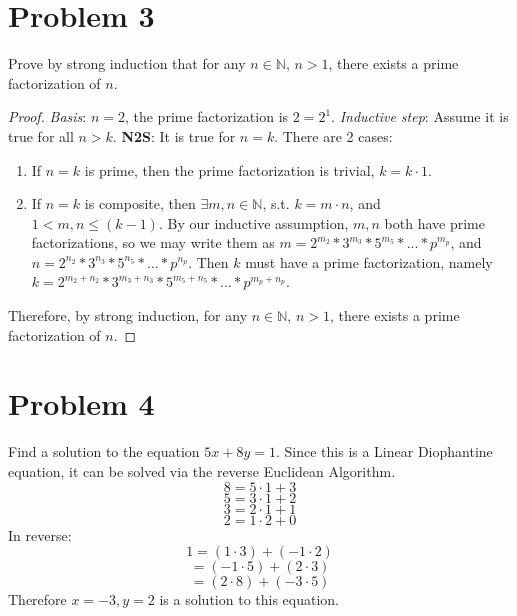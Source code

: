\documentclass[12pt]{article}
\newcommand{\N}{\mathbb{N}}
\begin{document}
\section{Problem 3}
Prove by strong induction that for any $n\in\N$, $n>1$, there exists a prime factorization of $n$.
\begin{proof}
\emph{Basis}: $n=2$, the prime factorization is $2=2^1$.
\newline \emph{Inductive step}: Assume it is true for all $n>k$. \newline \textbf{N2S}: It is true for $n=k$. There are 2 cases:\begin{enumerate}
    \item If $n=k$ is prime, then the prime factorization is trivial, $k=k\cdot1$.
    \item If $n=k$ is composite, then $\exists m,n\in\N$, s.t. $k=m\cdot n$, and $1<m,n\leq (k-1)$. By our inductive assumption, $m,n$ both have prime factorizations, so we may write them as $m=2^{m_2}*3^{m_3}*5^{m_5}*...*p^{m_p}$, and $n=2^{n_2}*3^{n_3}*5^{n_5}*...*p^{n_p}$. Then $k$ must have a prime factorization, namely $k=2^{m_2+n_2}*3^{m_3+n_3}*5^{m_5+n_5}*...*p^{m_p+n_p}$.
\end{enumerate}
Therefore, by strong induction, for any $n\in\N$, $n>1$, there exists a prime factorization of $n$.
\end{proof}
\section{Problem 4}
Find a solution to the equation $5x+8y=1$.
\newline Since this is a Linear Diophantine equation, it can be solved via the reverse Euclidean Algorithm.
$$8=5\cdot1+3$$ $$5=3\cdot1+2$$ $$3=2\cdot1+1$$ $$2=1\cdot2+0$$ In reverse: $$1=(1\cdot3)+(-1\cdot2)$$ $$=(-1\cdot5)+(2\cdot3)$$ $$=(2\cdot8)+(-3\cdot5)$$ Therefore $x=-3,y=2$ is a solution to this equation.
\end{document}
